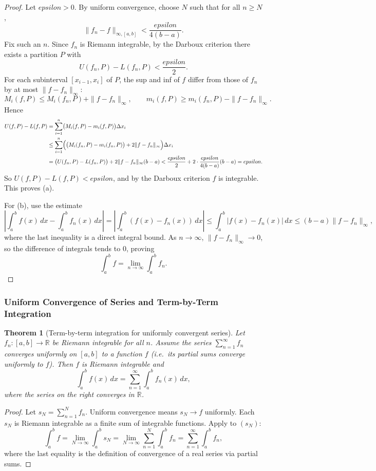 \documentclass[12pt]{article}
\numberwithin{equation}{section}
\def\abs#1{|#1|}
\def\eps{epsilon}
\def\diff{d}
\newcommand{\RR}{\mathbb{R}}
\DeclarePairedDelimiter{\abs}{\lvert}{\rvert}
\newcommand{\eps}{\varepsilon}               %
\newcommand{\diff}{\mathop{}\!\mathrm{d}}    %
\theoremstyle{plain}
\newtheorem{theorem}{Theorem}[section]
\theoremstyle{definition}
\theoremstyle{remark}
\begin{document}
\begin{proof}
Let $\eps>0$.
By uniform convergence, choose $N$ such that for all $n\ge N$,
\[
\|f_n-f\|_{\infty,[a,b]}<\frac{\eps}{4(b-a)}.
\]
Fix such an $n$.
Since $f_n$ is Riemann integrable, by the Darboux criterion there exists a partition $P$ with
\[
U(f_n,P)-L(f_n,P)<\frac{\eps}{2}.
\]
For each subinterval $[x_{i-1},x_i]$ of $P$,
the sup and inf of $f$ differ from those of $f_n$ by at most $\|f-f_n\|_\infty$:
\[
M_i(f,P)\le M_i(f_n,P)+\|f-f_n\|_\infty,\qquad
m_i(f,P)\ge m_i(f_n,P)-\|f-f_n\|_\infty.
\]
Hence
\begin{align*}
U(f,P)-L(f,P)
&=\sum_{i=1}^n \bigl(M_i(f,P)-m_i(f,P)\bigr)\Delta x_i\\
&\le \sum_{i=1}^n \Bigl(\bigl(M_i(f_n,P)-m_i(f_n,P)\bigr)+2\|f-f_n\|_\infty\Bigr)\Delta x_i\\
&=\bigl(U(f_n,P)-L(f_n,P)\bigr)+2\|f-f_n\|_\infty(b-a)
<\frac{\eps}{2}+2\cdot\frac{\eps}{4(b-a)}(b-a)=\eps.
\end{align*}
So $U(f,P)-L(f,P)<\eps$, and by the Darboux criterion $f$ is integrable. This proves (a).

For (b), use the estimate
\[
\left|\int_a^b f(x)\,\diff x-\int_a^b f_n(x)\,\diff x\right|
=
\left|\int_a^b (f(x)-f_n(x))\,\diff x\right|
\le \int_a^b \abs{f(x)-f_n(x)}\,\diff x
\le (b-a)\|f-f_n\|_\infty,
\]
where the last inequality is a direct integral bound.
As $n\to\infty$, $\|f-f_n\|_\infty\to 0$, so the difference of integrals tends to $0$, proving
\[
\int_a^b f=\lim_{n\to\infty}\int_a^b f_n.
\]
\end{proof}

\subsubsection{Uniform Convergence of Series and Term-by-Term Integration}

\begin{theorem}[Term-by-term integration for uniformly convergent series]\label{thm:series-int}
Let $f_n:[a,b]\to\RR$ be Riemann integrable for all $n$.
Assume the series $\sum_{n=1}^\infty f_n$ converges uniformly on $[a,b]$ to a function $f$ (i.e.\ its partial sums converge uniformly to $f$).
Then $f$ is Riemann integrable and
\[
\int_a^b f(x)\,\diff x
=
\sum_{n=1}^\infty \int_a^b f_n(x)\,\diff x,
\]
where the series on the right converges in $\RR$.
\end{theorem}

\begin{proof}
Let $s_N=\sum_{n=1}^N f_n$.
Uniform convergence means $s_N\to f$ uniformly.
Each $s_N$ is Riemann integrable as a finite sum of integrable functions.
Apply  to $(s_N)$:
\[
\int_a^b f=\lim_{N\to\infty}\int_a^b s_N
=\lim_{N\to\infty}\sum_{n=1}^N \int_a^b f_n
=\sum_{n=1}^\infty \int_a^b f_n,
\]
where the last equality is the definition of convergence of a real series via partial sums.
\end{proof}
\end{document}
